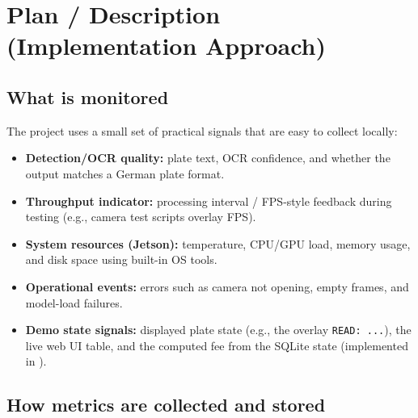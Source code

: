 \section{Plan / Description (Implementation Approach)}

\subsection{What is monitored}

\noindent
The project uses a small set of practical signals that are easy to collect locally:
\begin{itemize}
	\item \textbf{Detection/OCR quality:} plate text, OCR confidence, and whether the output matches a German plate format.
	\item \textbf{Throughput indicator:} processing interval / FPS-style feedback during testing (e.g., camera test scripts overlay FPS).
	\item \textbf{System resources (Jetson):} temperature, CPU/GPU load, memory usage, and disk space using built-in OS tools.
	\item \textbf{Operational events:} errors such as camera not opening, empty frames, and model-load failures.
	\item \textbf{Demo state signals:} displayed plate state (e.g., the overlay \texttt{READ: ...}), the live web UI table, and the computed fee from the SQLite state (implemented in ).
\end{itemize}

\subsection{How metrics are collected and stored}

